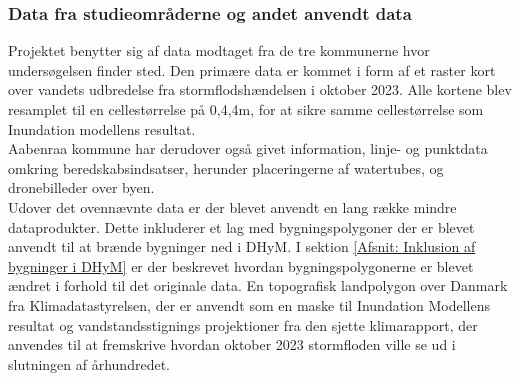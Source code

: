 \subsubsection{Data fra studieområderne og andet anvendt data} \label{Afsnit: Data fra studieområderne og andet anvendt data}
Projektet benytter sig af data modtaget fra de tre kommunerne hvor undersøgelsen finder sted. Den primære data er kommet i form af et raster kort over vandets udbredelse fra stormflodshændelsen i oktober 2023. Alle kortene blev resamplet til en cellestørrelse på 0,4,4m, for at sikre samme cellestørrelse som Inundation modellens resultat. \\
Aabenraa kommune har derudover også givet information, linje- og punktdata omkring beredskabsindsatser, herunder placeringerne af watertubes, og dronebilleder over byen. \\ 


Udover det ovennævnte data er der blevet anvendt en lang række mindre dataprodukter. 
Dette inkluderer et lag med bygningspolygoner der er blevet anvendt til at brænde bygninger ned i DHyM. I sektion \ref{Afsnit: Inklusion af bygninger i DHyM} er der beskrevet hvordan bygningspolygonerne er blevet ændret i forhold til det originale data. En topografisk landpolygon over Danmark fra Klimadatastyrelsen, der er anvendt som en maske til Inundation Modellens resultat og vandstandsstignings projektioner fra den sjette \cite{ipcc_report_AR6, NASA_tool} klimarapport, der anvendes til at fremskrive hvordan oktober 2023 stormfloden ville se ud i slutningen af århundredet. 